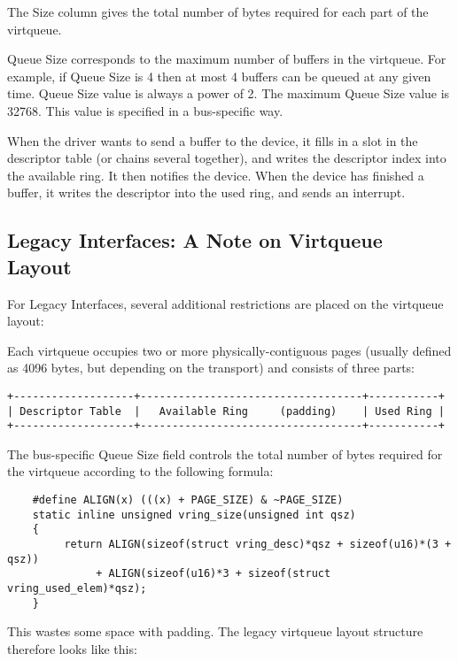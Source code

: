 The Size column gives the total number of bytes required for each
part of the virtqueue.

Queue Size corresponds to the maximum number of buffers in the
virtqueue.  For example, if Queue Size is 4 then at most 4 buffers
can be queued at any given time.  Queue Size value is always a
power of 2.  The maximum Queue Size value is 32768.  This value
is specified in a bus-specific way.

When the driver wants to send a buffer to the device, it fills in
a slot in the descriptor table (or chains several together), and
writes the descriptor index into the available ring.  It then
notifies the device. When the device has finished a buffer, it
writes the descriptor into the used ring, and sends an interrupt.


\subsection{Legacy Interfaces: A Note on Virtqueue Layout}\label{sec:Basic Facilities of a Virtio Device / Virtqueues / Legacy Interfaces: A Note on Virtqueue Layout}

For Legacy Interfaces, several additional
restrictions are placed on the virtqueue layout:

Each virtqueue occupies two or more physically-contiguous pages
(usually defined as 4096 bytes, but depending on the transport)
and consists of three parts:

\begin{verbatim}
+-------------------+-----------------------------------+-----------+
| Descriptor Table  |   Available Ring     (padding)    | Used Ring |
+-------------------+-----------------------------------+-----------+
\end{verbatim}

The bus-specific Queue Size field controls the total number of bytes
required for the virtqueue according to the following formula:

\begin{lstlisting}
	#define ALIGN(x) (((x) + PAGE_SIZE) & ~PAGE_SIZE)
	static inline unsigned vring_size(unsigned int qsz)
	{
	     return ALIGN(sizeof(struct vring_desc)*qsz + sizeof(u16)*(3 + qsz))
	          + ALIGN(sizeof(u16)*3 + sizeof(struct vring_used_elem)*qsz);
	}
\end{lstlisting}

This wastes some space with padding.
The legacy virtqueue layout structure therefore looks like this:

